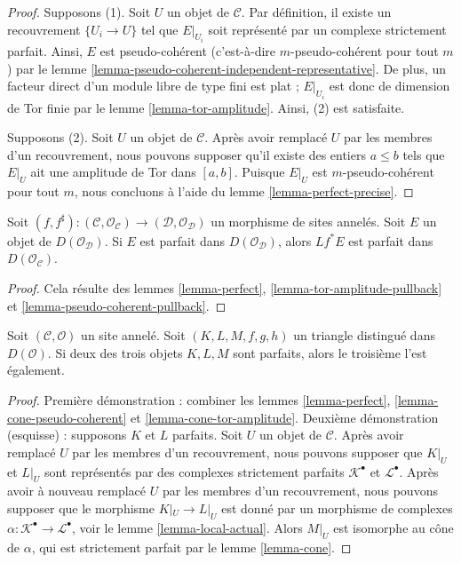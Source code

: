 \begin{proof}
Supposons (1). Soit $U$ un objet de $\mathcal{C}$. Par définition, il existe
un recouvrement $\{U_i \to U\}$ tel que $E|_{U_i}$ soit représenté par un
complexe strictement parfait. Ainsi, $E$ est pseudo-cohérent (c'est-à-dire
$m$-pseudo-cohérent pour tout $m$) par le lemme
\ref{lemma-pseudo-coherent-independent-representative}. De plus, un facteur
direct d'un module libre de type fini est plat ; $E|_{U_i}$ est donc de
dimension de Tor finie par le lemme \ref{lemma-tor-amplitude}. Ainsi, (2) est
satisfaite.

\medskip\noindent
Supposons (2). Soit $U$ un objet de $\mathcal{C}$. Après avoir remplacé $U$
par les membres d'un recouvrement, nous pouvons supposer qu'il existe des
entiers $a \leq b$ tels que $E|_U$ ait une amplitude de Tor dans $[a, b]$.
Puisque $E|_U$ est $m$-pseudo-cohérent pour tout $m$, nous concluons à l'aide
du lemme \ref{lemma-perfect-precise}.
\end{proof}

\begin{lemma}
\label{lemma-perfect-pullback}
Soit $(f, f^\sharp) : (\mathcal{C}, \mathcal{O}_\mathcal{C}) \to
(\mathcal{D}, \mathcal{O}_\mathcal{D})$
un morphisme de sites annelés. Soit $E$ un objet de
$D(\mathcal{O}_\mathcal{D})$. Si $E$ est parfait dans
$D(\mathcal{O}_\mathcal{D})$, alors $Lf^*E$ est parfait dans
$D(\mathcal{O}_\mathcal{C})$.
\end{lemma}

\begin{proof}
Cela résulte des lemmes \ref{lemma-perfect},
\ref{lemma-tor-amplitude-pullback} et
\ref{lemma-pseudo-coherent-pullback}.
\end{proof}

\begin{lemma}
\label{lemma-two-out-of-three-perfect}
Soit $(\mathcal{C}, \mathcal{O})$ un site annelé. Soit $(K, L, M, f, g, h)$
un triangle distingué dans $D(\mathcal{O})$. Si deux des trois objets
$K, L, M$ sont parfaits, alors le troisième l'est également.
\end{lemma}

\begin{proof}
Première démonstration : combiner les lemmes \ref{lemma-perfect},
\ref{lemma-cone-pseudo-coherent} et \ref{lemma-cone-tor-amplitude}.
Deuxième démonstration (esquisse) : supposons $K$ et $L$ parfaits. Soit $U$
un objet de $\mathcal{C}$. Après avoir remplacé $U$ par les membres d'un
recouvrement, nous pouvons supposer que $K|_U$ et $L|_U$ sont représentés
par des complexes strictement parfaits $\mathcal{K}^\bullet$ et
$\mathcal{L}^\bullet$. Après avoir à nouveau remplacé $U$ par les membres
d'un recouvrement, nous pouvons supposer que le morphisme
$K|_U \to L|_U$ est donné par un morphisme de complexes
$\alpha : \mathcal{K}^\bullet \to \mathcal{L}^\bullet$, voir le lemme
\ref{lemma-local-actual}. Alors $M|_U$ est isomorphe au cône de $\alpha$, qui
est strictement parfait par le lemme \ref{lemma-cone}.
\end{proof}


